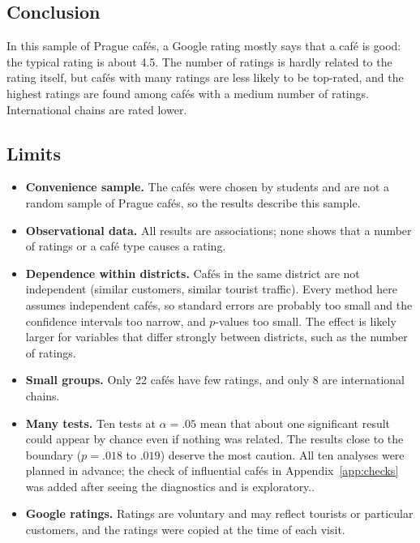 \documentclass[11pt,a4paper]{article}
\begin{document}
\subsection{Conclusion}
In this sample of Prague caf\'es, a Google rating mostly says that a caf\'e is good: the typical rating is about 4.5. The number of ratings is hardly related to the rating itself, but caf\'es with many ratings are less likely to be top-rated, and the highest ratings are found among caf\'es with a medium number of ratings. International chains are rated lower.

\subsection{Limits}
\begin{itemize}
  \item \textbf{Convenience sample.} The caf\'es were chosen by students and are not a random sample of Prague caf\'es, so the results describe this sample.
  \item \textbf{Observational data.} All results are associations; none shows that a number of ratings or a caf\'e type causes a rating.
  \item \textbf{Dependence within districts.} Caf\'es in the same district are not independent (similar customers, similar tourist traffic). Every method here assumes independent caf\'es, so standard errors are probably too small and the confidence intervals too narrow, and $p$-values too small. The effect is likely larger for variables that differ strongly between districts, such as the number of ratings.
  \item \textbf{Small groups.} Only 22 caf\'es have few ratings, and only 8 are international chains.
  \item \textbf{Many tests.} Ten tests at $\alpha=.05$ mean that about one significant result could appear by chance even if nothing was related. The results close to the boundary ($p=.018$ to $.019$) deserve the most caution. All ten analyses were planned in advance; the check of influential caf\'es in Appendix~\ref{app:checks} was added after seeing the diagnostics and is exploratory..
  \item \textbf{Google ratings.} Ratings are voluntary and may reflect tourists or particular customers, and the ratings were copied at the time of each visit.
\end{itemize}

\appendix
\end{document}
